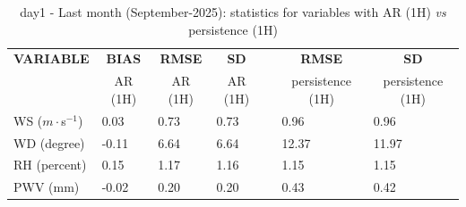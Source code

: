 \begin{table}[]
\begin{center}
\begin{tabular}{|l|l|l|l|l|l|l|}
\hline
\multicolumn{1}{|c|}{\cellcolor[HTML]{C0C0C0}\textbf{VARIABLE}} & \multicolumn{1}{c|}{\cellcolor[HTML]{C0C0C0}\textbf{BIAS}} & \multicolumn{1}{c|}{\cellcolor[HTML]{C0C0C0}\textbf{RMSE}} & \multicolumn{1}{c|}{\cellcolor[HTML]{C0C0C0}\textbf{SD}} & & \multicolumn{1}{c|}{\cellcolor[HTML]{C0C0C0}\textbf{RMSE}} & \multicolumn{1}{c|}{\cellcolor[HTML]{C0C0C0}\textbf{SD}}\\
\multicolumn{1}{|c|}{\cellcolor[HTML]{C0C0C0}} & \multicolumn{1}{c|}{\cellcolor[HTML]{C0C0C0}AR (1H)} & \multicolumn{1}{c|}{\cellcolor[HTML]{C0C0C0}AR (1H)} & \multicolumn{1}{c|}{\cellcolor[HTML]{C0C0C0}AR (1H)} & & \multicolumn{1}{c|}{\cellcolor[HTML]{C0C0C0}persistence (1H)} & \multicolumn{1}{c|}{\cellcolor[HTML]{C0C0C0}persistence (1H)}\\\hline
\cellcolor[HTML]{C0C0C0}WS ($m\cdot$s$^{-1}$) &      0.03  &      0.73  &      0.73  & &      0.96  &      0.96\\
\cellcolor[HTML]{C0C0C0}WD (degree)           &     -0.11  &      6.64  &      6.64  & &     12.37  &     11.97\\
\cellcolor[HTML]{C0C0C0}RH (percent)          &      0.15  &      1.17  &      1.16  & &      1.15  &      1.15\\
\cellcolor[HTML]{C0C0C0}PWV (mm)              &     -0.02 &      0.20 &      0.20 & &      0.43 &      0.42\\
\hline
\end{tabular}
\caption{day1 - Last month (September-2025): statistics for variables with AR (1H) \textit{vs} persistence (1H)}\label{tab:day1:statAFT:LM}
\end{center}
\end{table}

